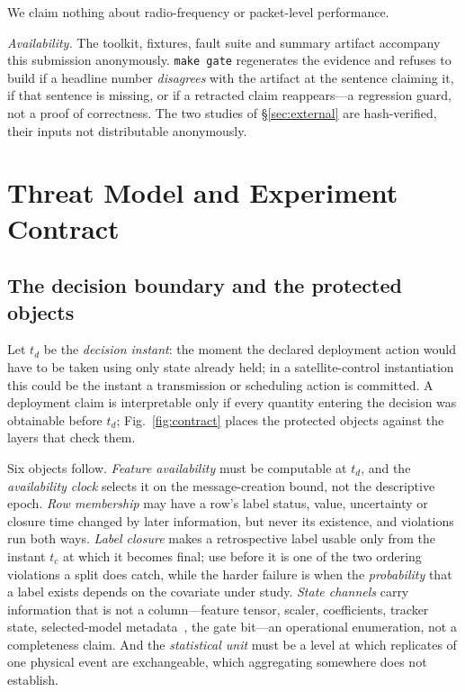 \documentclass[conference]{IEEEtran}
\begin{document}
We claim nothing about radio-frequency or packet-level performance.

\emph{Availability.} The toolkit, fixtures, fault suite and summary artifact accompany this
submission anonymously. \texttt{make gate} regenerates the evidence and refuses to build if a headline number
\emph{disagrees} with the artifact at the sentence claiming it, if that sentence is missing, or if a
retracted claim reappears---a regression guard, not a proof of correctness. The two studies of
\S\ref{sec:external} are hash-verified, their inputs not distributable anonymously.

\section{Threat Model and Experiment Contract}


\subsection{The decision boundary and the protected objects}

Let $t_d$ be the \emph{decision instant}: the moment the declared deployment action would have to be
taken using only state already held; in a satellite-control instantiation this could be the instant
a transmission or scheduling action is committed. A deployment claim is interpretable only if every quantity entering the decision was obtainable
before $t_d$; Fig.~\ref{fig:contract} places the protected objects against the layers that check
them.

Six objects follow. \emph{Feature availability} must be computable at $t_d$, and the
\emph{availability clock} selects it on the message-creation bound, not the descriptive epoch. \emph{Row membership} may have a row's label status, value, uncertainty or
closure time changed by later information, but never its existence, and violations run both ways.
\emph{Label closure} makes a retrospective label usable only from the instant $t_c$ at which it
becomes final; use before it is one of the
two ordering violations a split does catch, while the harder failure is when the \emph{probability}
that a label exists depends on the covariate under study. \emph{State channels} carry information
that is not a column---feature tensor, scaler, coefficients, tracker state, selected-model
metadata~\cite{cawley2010selection}, the gate bit---an operational enumeration, not a completeness
claim. And the \emph{statistical unit} must be a level at which replicates of one physical event are
exchangeable, which aggregating somewhere does not establish.
\end{document}
